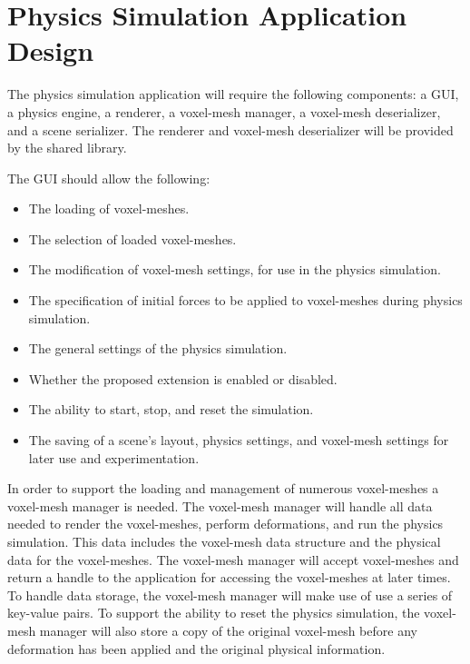 


\section{Physics Simulation Application Design}

The physics simulation application will require the following components: a GUI, a physics 
engine, a renderer, a voxel-mesh manager, a voxel-mesh deserializer, and a scene serializer. The 
renderer and voxel-mesh deserializer will be provided by the shared library.

The GUI should allow the following:

\begin{itemize}
  \item The loading of voxel-meshes.
  \item The selection of loaded voxel-meshes.
  \item The modification of voxel-mesh settings, for use in the physics simulation.
  \item The specification of initial forces to be applied to voxel-meshes during physics simulation.
  \item The general settings of the physics simulation.
  \item Whether the proposed extension is enabled or disabled.
  \item The ability to start, stop, and reset the simulation.
  \item The saving of a scene's layout, physics settings, and voxel-mesh settings for later use and
  experimentation.
\end{itemize}

In order to support the loading and management of numerous voxel-meshes a voxel-mesh manager is 
needed. The voxel-mesh manager will handle all data needed to render the voxel-meshes, perform
deformations, and run the physics simulation. This data includes the voxel-mesh data structure and
the physical data for the voxel-meshes. The voxel-mesh manager will accept voxel-meshes and return a 
handle to the application for accessing the voxel-meshes at later times. 
To handle data storage, the voxel-mesh manager will make use of use a series of key-value pairs. To 
support the ability to reset the physics simulation, the voxel-mesh manager will also store a
copy of the original voxel-mesh before any deformation has been applied and the original physical 
information.

